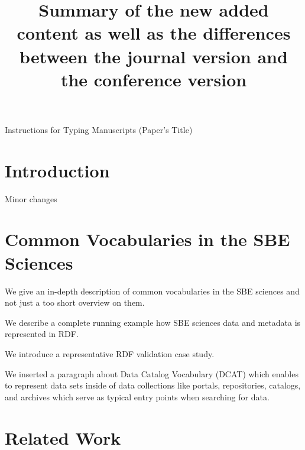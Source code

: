 \documentclass{ws-ijsc}
\begin{document}
{Instructions for Typing Manuscripts (Paper's Title)}

%
\catchline{}{}{}{}{}
%

\title{Summary of the new added content as well as the differences between the journal version and the conference version}



\maketitle



\begin{abstract}

\end{abstract}

\section{Introduction}

\begin{itemlist}
 \item Minor changes
\end{itemlist}

\section{Common Vocabularies in the SBE Sciences}	

\begin{itemlist}
 \item We give an in-depth description of common vocabularies in the SBE sciences and not just a too short overview on them.
 \item We describe a complete running example how SBE sciences data and metadata is represented in RDF.
 \item We introduce a representative RDF validation case study.
 \item We inserted a paragraph about Data Catalog Vocabulary (DCAT) which enables to represent data sets inside of data collections like portals, repositories, catalogs, and archives which serve as typical entry points when searching for data.
\end{itemlist}

\section{Related Work}
\end{document}
